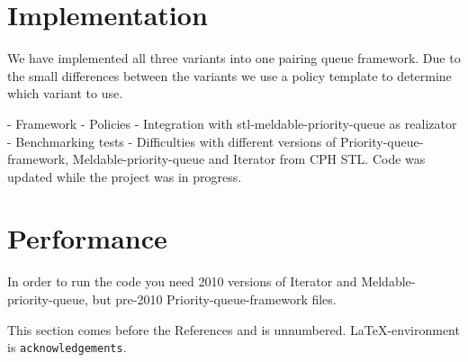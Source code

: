 \documentclass{DIKU-article}[2010/01/13]
\begin{document}
\section{Implementation}

We have implemented all three variants into one pairing queue framework. Due to
the small differences between the variants we use a policy template to determine
which variant to use. 

- Framework
- Policies
- Integration with stl-meldable-priority-queue as realizator
- Benchmarking tests
- Difficulties with different versions of Priority-queue-framework,
  Meldable-priority-queue and Iterator from CPH STL. Code was updated while the
  project was in progress.

\section{Performance}

In order to run the code you need 2010 versions of Iterator and
Meldable-priority-queue, but pre-2010 Priority-queue-framework files.

\begin{acknowledgements}
This section comes before the References and is unnumbered.
\LaTeX-en\-viron\-ment is \verb|acknowledgements|.
\end{acknowledgements}


\end{document}
